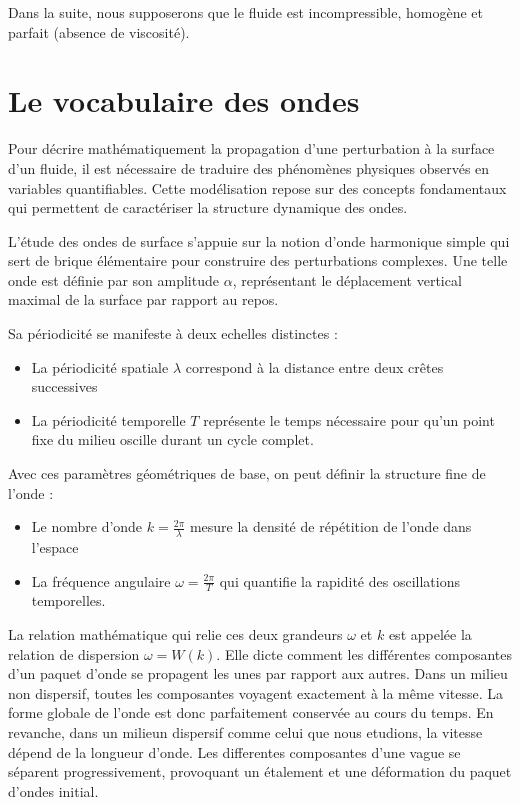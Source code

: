 \vspace{1em}
Dans la suite, nous supposerons que le fluide est incompressible, homogène et parfait (absence de viscosité). 


\section{Le vocabulaire des ondes}

Pour décrire mathématiquement la propagation d'une perturbation à la surface d'un fluide, il est nécessaire de traduire des phénomènes physiques observés en variables quantifiables. Cette modélisation repose sur des concepts fondamentaux qui permettent de caractériser la structure dynamique des ondes.

L'étude des ondes de surface s'appuie sur la notion d'onde harmonique simple qui sert de brique élémentaire pour construire des perturbations complexes. Une telle onde est définie par son amplitude $\alpha$, représentant le déplacement vertical maximal de la surface par rapport au repos.

Sa périodicité se manifeste à deux echelles distinctes :

\begin{itemize}
    \item La périodicité spatiale $\lambda$ correspond à la distance entre deux crêtes successives \item La périodicité temporelle $T$ représente le temps nécessaire pour qu'un point fixe du milieu oscille durant un cycle complet. 
\end{itemize}

Avec ces paramètres géométriques de base, on peut définir la structure fine de l'onde :

\begin{itemize}
    \item Le nombre d'onde $k = \frac{2\pi}{\lambda}$ mesure la densité de répétition de l'onde dans l'espace
    \item La fréquence angulaire $\omega = \frac{2\pi}{T}$ qui quantifie la rapidité des oscillations temporelles. 
\end{itemize}

La relation mathématique qui relie ces deux grandeurs $\omega$ et $k$ est appelée la relation de dispersion $\omega = W(k)$. Elle dicte comment les différentes composantes d'un paquet d'onde se propagent les unes par rapport aux autres. Dans un milieu non dispersif, toutes les composantes voyagent exactement à la même vitesse. La forme globale de l'onde est donc parfaitement conservée au cours du temps. En revanche, dans un milieun dispersif comme celui que nous etudions, la vitesse dépend de la longueur d'onde. Les differentes composantes d'une vague se séparent progressivement, provoquant un étalement et une déformation du paquet d'ondes initial.


